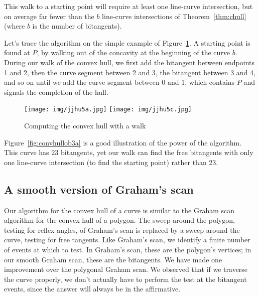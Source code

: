 \documentclass[12pt]{article}
\begin{document}
This walk to a starting point will require at least one line-curve intersection,
but on average far fewer than the $b$ line-curve intersections
of Theorem~\ref{thm:chull} (where $b$ is the number of bitangents).

\begin{example}
Let's trace the algorithm on the simple example of Figure~\ref{fig:algtrace}.
A starting point is found at $P$, by walking out of the concavity
at the beginning of the curve $b$.
During our walk of the convex hull, 
we first add the bitangent between endpoints 1 and 2,
then the curve segment between 2 and 3, the bitangent between 3 and 4,
and so on until we add the curve segment between 0 and 1,
which contains $P$ and signals the completion of the hull.
\end{example}

\begin{figure}[h]
\begin{center}
\texttt{[image: img/jjhu5a.jpg]}
\texttt{[image: img/jjhu5c.jpg]}
\end{center}
\caption{Computing the convex hull with a walk}
\label{fig:algtrace}
\end{figure}

Figure~\ref{fig:convhullob3a} is a good illustration of the power of the 
algorithm.
This curve has 23 bitangents, yet our walk can find the free bitangents
with only one line-curve intersection (to find the starting point)
rather than 23.


\subsection{A smooth version of Graham's scan}

Our algorithm for the convex hull of a curve
is similar to the Graham scan algorithm for the convex hull of a polygon.
The sweep around the polygon, testing for reflex angles, of Graham's scan is 
replaced by a sweep around the curve, testing for free tangents.
Like Graham's scan, 
we identify a finite number of events at which to test.
In Graham's scan, these are the polygon's vertices;
in our smooth Graham scan, these are the bitangents.
We have made one improvement over the polygonal Graham scan.
We observed that if we traverse the curve properly,
we don't actually have to perform the test at the bitangent events, 
since the answer will always be in the affirmative.
\end{document}
